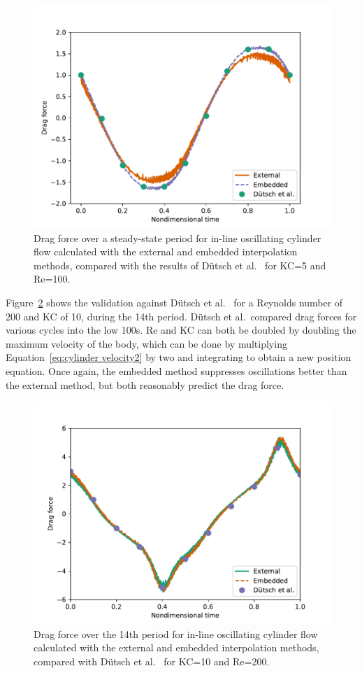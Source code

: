\documentclass[preprint,12pt]{elsarticle}
\begin{document}
\begin{figure}[htbp]
    \centering
    \includegraphics[width=0.75\linewidth]{static_ss.pdf}
    \caption{Drag force over a steady-state period for in-line oscillating cylinder flow
    calculated with the external and embedded interpolation methods, compared with
    the results of D\"{u}tsch et al.~\cite{dutsch1998low} for KC=5 and Re=100.
    }
    \label{fig:staticSteady}
\end{figure}

Figure~\ref{fig:KC 10} shows the validation against D\"{u}tsch et al.~\cite{dutsch1998low}
for a Reynolds number of 200 and KC of 10, during the 14th period.
D\"{u}tsch et al.\ compared drag forces for various cycles into the low 100s.
Re and KC can both be doubled by doubling the maximum velocity of the body, which can
be done by multiplying Equation~\eqref{eq:cylinder velocity2} by two and integrating to
obtain a new position equation. Once again, the embedded method suppresses oscillations
better than the external method, but both reasonably predict the drag force.
\begin{figure}[htbp]
    \centering
    \includegraphics[width=0.75\linewidth]{static_kc10.pdf}
    \caption{Drag force over the 14th period for in-line oscillating cylinder flow
    calculated with the external and embedded interpolation methods,
    compared with D\"{u}tsch et al.~\cite{dutsch1998low} for KC=10 and Re=200.}
    \label{fig:KC 10}
\end{figure}
\end{document}
